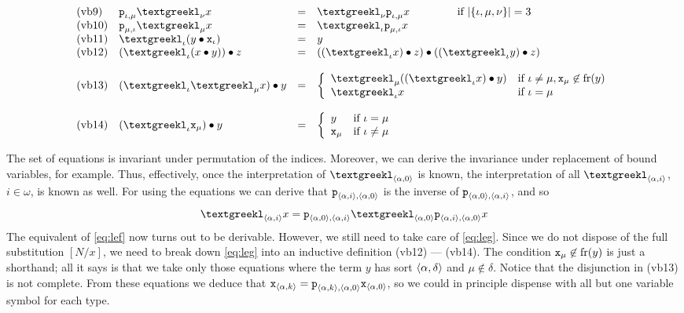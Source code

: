 \begin{table}
$$\begin{array}{ll@{\quad \doteq \quad}l}
\mbox{\rm (vb9)} & 
\mbox{\tt p}_{\iota,\mu}\tlambda_{\nu} x &
    \tlambda_{\nu} \mbox{\tt p}_{\iota,\mu} x
    \qquad\qquad\mbox{ if } |\{\iota, \mu, \nu\}| = 3 \\
\mbox{\rm (vb10)} & 
\mbox{\tt p}_{\mu,\iota} \tlambda_{\mu} x & 
	\tlambda_{\iota} \mbox{\tt p}_{\mu,\iota} x \\
\mbox{\rm (vb11)} & 
\tlambda_{\iota}(y \bullet \mbox{\tt x}_{\iota}) & y \\
\mbox{\rm (vb12)} & 
(\tlambda_{\iota}(x \bullet y)) \bullet z &
    ((\tlambda_{\iota} x)\bullet z) \bullet ((\tlambda_{\iota}
    y) \bullet z) \\
\multicolumn{3}{l}{} \\
\mbox{\rm (vb13)} & 
(\tlambda_{\iota}\tlambda_{\mu} x) \bullet y & 
	\left\{\begin{array}{ll}
		\tlambda_{\mu} ((\tlambda_{\iota} x) \bullet y) & 
		\mbox{if }{\iota} \neq {\mu}, \mbox{\tt x}_{\mu} 
		\not\in \fr(y) \\
	\tlambda_{\iota} x & \mbox{if }{\iota} = {\mu} 
	\end{array}\right. \\
\multicolumn{3}{l}{} \\
\mbox{\rm (vb14)} & 
(\tlambda_{\iota} \mbox{\tt x}_{\mu}) \bullet y & 
	\left\{\begin{array}{ll}
		y & \mbox{if }{\iota} = {\mu} \\
		\mbox{\tt x}_{\mu} & \mbox{if }{\iota} \neq {\mu}
	\end{array}\right.
\end{array}$$
\end{table}
The set of equations is invariant under permutation of the indices. 
Moreover, we can derive the invariance under replacement of bound 
variables, for example. Thus, effectively, once the interpretation 
of $\tlambda_{\auf \alpha,0\zu}$ is known, the interpretation of all 
$\tlambda_{\auf \alpha, i\zu}$, $i\in \omega$, is known as well. 
For using the equations we can derive that $\mbox{\tt p}_{\langle \alpha, 
i\rangle, \langle \alpha, 0\rangle}$ is the inverse of $\mbox{\tt p}_{\langle \alpha, 
0\rangle, \langle \alpha, i\rangle}$, 
and so 
\begin{equation}
\tlambda_{\auf \alpha, i\zu} x \doteq \mbox{\tt p}_{\auf \alpha, 0\zu,
\auf\alpha, i\zu} \tlambda_{\auf \alpha, 0\zu} \mbox{\tt p}_{\auf \alpha, 
i\zu, \auf \alpha, 0\zu}
x
\end{equation}
The equivalent of \eqref{eq:lef} now turns out to be derivable. 
However, we still need to take care of \eqref{eq:leg}. Since we 
do not dispose of the full substitution $[N/x]$, we need to break 
down \eqref{eq:leg} into an inductive definition (vb12) --- (vb14).
The condition $\mbox{\tt x}_{\mu} \not\in \operatorname{fr}(y)$ is 
just a shorthand; all it says is that we take only those 
equations where the term $y$ has sort $\langle \alpha, \delta\rangle$ and 
${\mu} \not\in \delta$. Notice that the disjunction in (vb13) is 
not complete. From these equations we deduce that 
$\mbox{\tt x}_{\langle \alpha, k\rangle} = \mbox{\tt p}_{\langle \alpha, k\rangle,
\langle \alpha, 0\rangle} \mbox{\tt x}_{\langle \alpha, 0\rangle}$, 
so we could in principle dispense with all but one variable symbol 
for each type. 

